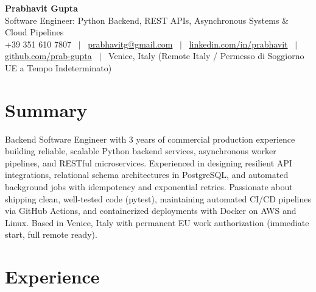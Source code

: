 \documentclass[a4paper,10pt]{article}
\begin{document}
\begin{minipage}[c]{0.80\textwidth}
 {\Huge\bfseries Prabhavit Gupta}\\[3pt]
 {\color{accent}\large Software Engineer: Python Backend, REST APIs, Asynchronous Systems \& Cloud Pipelines}\\[6pt]
 {\footnotesize +39 351 610 7807 ~$\vert$~
 \href{mailto:prabhavitg@gmail.com}{prabhavitg@gmail.com} ~$\vert$~
 \href{https://www.linkedin.com/in/prabhavit/}{linkedin.com/in/prabhavit} ~$\vert$~
 \href{https://github.com/prab-gupta}{github.com/prab-gupta} ~$\vert$~
 Venice, Italy (Remote Italy / Permesso di Soggiorno UE a Tempo Indeterminato)}
\end{minipage}\hfill

\section{Summary}
Backend Software Engineer with 3 years of commercial production experience building reliable, scalable Python backend services, asynchronous worker pipelines, and RESTful microservices. Experienced in designing resilient API integrations, relational schema architectures in PostgreSQL, and automated background jobs with idempotency and exponential retries. Passionate about shipping clean, well-tested code (pytest), maintaining automated CI/CD pipelines via GitHub Actions, and containerized deployments with Docker on AWS and Linux. Based in Venice, Italy with permanent EU work authorization (immediate start, full remote ready).

\section{Experience}
\end{document}
